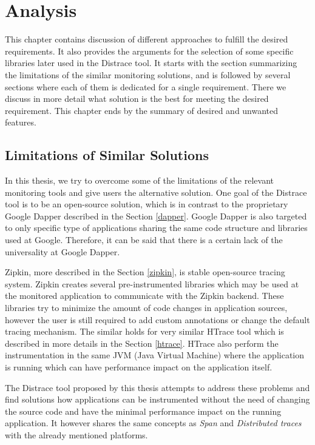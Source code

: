 \chapter{Analysis}
\label{analysis}
This chapter contains discussion of different approaches to fulfill the desired requirements. It also provides the arguments for the selection of some specific libraries later used in the Distrace tool. It starts with the section summarizing the limitations of the similar monitoring solutions, and is followed by several sections where each of them is dedicated for a single requirement. There we discuss in more detail what solution is the best for meeting the desired requirement. This chapter ends by the summary of desired and unwanted features.

\section{Limitations of Similar Solutions}
In this thesis, we try to overcome some of the limitations of the relevant monitoring tools and give users the alternative solution. One goal of the Distrace tool is to be an open-source solution, which is in contrast to the proprietary Google Dapper described in the Section \ref{dapper}. Google Dapper is also targeted to only specific type of applications sharing the same code structure and libraries used at Google. Therefore, it can be said that there is a certain lack of the universality at Google Dapper. 

Zipkin, more described in the Section \ref{zipkin}, is stable open-source tracing system. Zipkin creates several pre-instrumented libraries which may be used at the monitored application to communicate with the Zipkin backend. These libraries try to minimize the amount of code changes in application sources, however the user is still required to add custom annotations or change the default tracing mechanism. The similar holds for very similar HTrace tool which is described in more details in the Section \ref{htrace}. HTrace also perform the instrumentation in the same JVM (Java Virtual Machine) where the application is running which can have performance impact on the application itself.

The Distrace tool proposed by this thesis attempts to address these problems and find solutions how applications can be instrumented without the need of changing the source code and have the minimal performance impact on the running application. It however shares the same concepts as \textit{Span} and\textit{ Distributed traces} with the already mentioned platforms.
